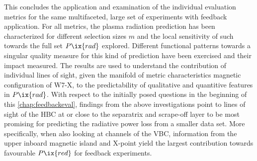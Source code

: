 %
                \newline%
                This concludes the application and examination of the individual evaluation metrics for the same multifaceted, large set of experiments with feedback application. For all metrics, the plasma radiation prediction has been characterized for different selection sizes $m$ and the local sensitivity of such towards the full set $P\ix{rad}$ explored. Different functional patterns towards a singular quality measure for this kind of prediction have been exercised and their impact measured. The results are used to understand the contribution of individual lines of sight, given the manifold of metric characteristics magnetic configuration of W7-X, to the predictability of qualitative and quantitive features in $P\ix{rad}$. With respect to the initially posed questions in the beginning of this \cref{chap:feedbackeval}, findings from the above investigations point to lines of sight of the HBC at or close to the separatrix and scrape-off layer to be most promising for predicting the radiative power loss from a smaller data set. More specifically, when also looking at channels of the VBC, information from the upper inboard magnetic island and X-point yield the largest contribution towards favourable $P\ix{red}$ for feedback experiments.
%
